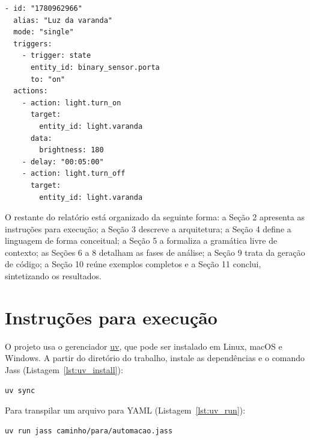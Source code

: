 \documentclass[12pt]{article}
\renewcommand\texttt[1]{\svtt{\small#1}}
\begin{document}
\begin{listing}[H]
    \centering
    \begin{verbatim}
- id: "1780962966"
  alias: "Luz da varanda"
  mode: "single"
  triggers:
    - trigger: state
      entity_id: binary_sensor.porta
      to: "on"
  actions:
    - action: light.turn_on
      target:
        entity_id: light.varanda
      data:
        brightness: 180
    - delay: "00:05:00"
    - action: light.turn_off
      target:
        entity_id: light.varanda
    \end{verbatim}
    
    \caption{A saída YAML da automação anterior.}
    \label{lst:jass_example1_yaml}
\end{listing}

O restante do relatório está organizado da seguinte forma: a Seção 2 apresenta as instruções para execução; a Seção
3 descreve a arquitetura; a Seção 4 define a
linguagem de forma conceitual; a Seção 5 a formaliza a gramática
livre de contexto; as Seções 6 a 8 detalham as fases de análise; a Seção 9 trata da geração de código; a Seção 10 reúne
exemplos completos e a Seção 11 conclui, sintetizando os resultados.

\section{Instruções para execução}

O projeto usa o gerenciador \href{https://docs.astral.sh/uv/getting-started/installation/}{uv}, que pode ser instalado em Linux, macOS e Windows. A partir do diretório do
trabalho, instale as dependências e o comando Jass (Listagem~\ref{lst:uv_install}):

\begin{listing}[H]
    \centering
    \begin{verbatim}
uv sync
\end{verbatim}
    \caption{Comando para configurar o projeto.}
    \label{lst:uv_install}
\end{listing}

Para transpilar um arquivo \texttt{.jass} para YAML (Listagem~\ref{lst:uv_run}):

\begin{listing}[H]
    \centering
    \begin{verbatim}
uv run jass caminho/para/automacao.jass
\end{verbatim}
    \caption{Comando para transpilar um arquivo .jass para YAML.}
    \label{lst:uv_run}
\end{listing}
\end{document}
